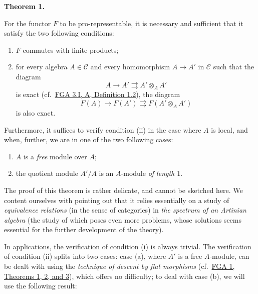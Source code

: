 \documentclass{article}
\providecommand{\tightlist}{%
  \setlength{\itemsep}{0pt}\setlength{\parskip}{0pt}}
\newenvironment{itenv}[1]
  {\phantomsection\par\smallskip\noindent\textbf{#1.}\itshape}
  {\par\smallskip}
\newcommand{\oldpage}[1]{\marginpar{\footnotesize$\Big\vert$ \textit{p.~#1}}}
\theoremstyle{definition}
\theoremstyle{definition}
\theoremstyle{definition}
\theoremstyle{definition}
\theoremstyle{remark}
\begin{document}
\hypertarget{fga-3-ii-section-B-theorem-1}{}
\begin{itenv}{Theorem 1}

For the functor \(F\) to be pro-representable, it is necessary and sufficient that it satisfy the two following conditions:

\begin{enumerate}
\def\labelenumi{\roman{enumi}.}
\tightlist
\item
  \(F\) commutes with finite products;
\item
  for every algebra \(A\in{\mathcal{C}}\) and every homomorphism \(A\to A'\) in \({\mathcal{C}}\) such that the diagram
  \[
  A \to A' \rightrightarrows A'\otimes_A A'
    \]
  is exact (cf.~\protect\hyperlink{fga-3-i-section-A.1-definition-1.2}{FGA 3.I, A, Definition 1.2}), the diagram
  \[
  F(A) \to F(A') \rightrightarrows F(A'\otimes_A A')
    \]
  is also exact.
\end{enumerate}

\oldpage{195-10}Furthermore, it suffices to verify condition (ii) in the case where \(A\) is local, and when, further, we are in one of the two following cases:

\begin{enumerate}
\def\labelenumi{\alph{enumi}.}
\tightlist
\item
  \(A\) is a \emph{free} module over \(A\);
\item
  the quotient module \(A'/A\) is an \(A\)-module \emph{of length \(1\)}.
\end{enumerate}

\end{itenv}

The proof of this theorem is rather delicate, and cannot be sketched here.
We content ourselves with pointing out that it relies essentially on a study of \emph{equivalence relations} (in the sense of categories) in \emph{the spectrum of an Artinian algebra} (the study of which poses even more problems, whose solutions seems essential for the further development of the theory).

In applications, the verification of condition (i) is always trivial.
The verification of condition (ii) splits into two cases: case (a), where \(A'\) is a free \(A\)-module, can be dealt with using the \emph{technique of descent by flat morphisms} (cf.~\protect\hyperlink{fga-1}{FGA 1, Theorems 1, 2, and 3}), which offers no difficulty;
to deal with case (b), we will use the following result:
\end{document}
